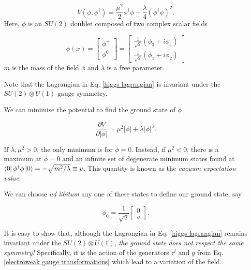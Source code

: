 \documentclass[10pt,a4paper]{book}
\begin{document}
\begin{equation}
    V(\phi, \phi^\dagger) = \frac{\mu^2}{2}\phi^\dagger \phi - \frac{\lambda}{4}(\phi^\dagger\phi)^2.
\end{equation}
Here, $\phi$ is an $SU(2)$ doublet composed of two complex scalar fields

\begin{equation}
    \phi(x) = 
\begin{bmatrix}
\phi^+ \\
\phi^0
\end{bmatrix} =
\begin{bmatrix}
\frac{1}{\sqrt{2}}(\phi_3 + i\phi_4) \\
\frac{1}{\sqrt{2}}(\phi_1 + i\phi_2)
\end{bmatrix}
\label{higgs doublet}
\end{equation}
$m$ is the mass of the field $\phi$ and $\lambda$ is a free parameter. 

Note that the Lagrangian in Eq. \ref{higgs lagrangian} is invariant under the $SU(2)\otimes U(1)$ gauge symmetry.

We can minimise the potential to find the ground state of $\phi$

\begin{equation}
    \frac{\partial V}{\partial \vert \phi \vert} = \mu^2\vert \phi \vert + \lambda\vert\phi\vert^3 .
\end{equation}

If $\lambda, \mu^2 > 0$, the only minimum is for $\phi = 0$. Instead, if $\mu^2 < 0$, there is a maximum at $\phi = 0$ and an infinite set of degenerate minimum states found at $\bra 0\phi^\dagger\phi \ket 0 = -\sqrt{m^2/\lambda} \equiv v$. This quantity is known as the \emph{vacuum expectation value}.

We can choose \emph{ad libitum} any one of these states to define our ground state, say

\begin{equation}
    \phi_0 = \frac{1}{\sqrt{2}}\begin{bmatrix}
    0 \\
     v
    \end{bmatrix}.
\end{equation}

It is easy to show that, although the Lagrangian in Eq. \ref{higgs lagrangian} remains invariant under the $SU(2) \otimes U(1)$, \emph{the ground state does not respect the same symmetry!} Specifically, it is the action of the generators $\tau^i$ and $y$ from Eq. \ref{electroweak gauge transformations} which lead to a variation of the field. 
\end{document}
